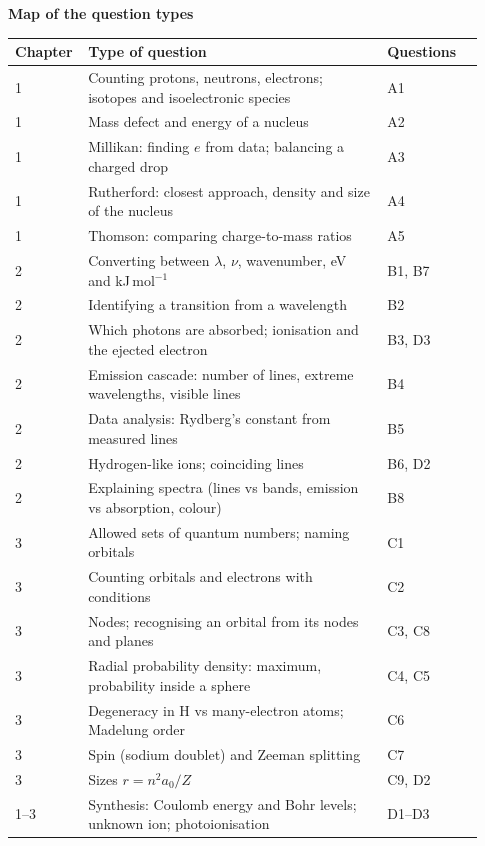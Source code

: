 \documentclass[11pt]{article}
\begin{document}
\vspace{2mm}
{\sffamily\bfseries\color{heading} Map of the question types}\par\vspace{1mm}
{\small
\renewcommand{\arraystretch}{1.12}
\begin{tabular}{@{}p{0.11\linewidth}p{0.62\linewidth}p{0.2\linewidth}@{}}
\toprule
Chapter & Type of question & Questions\\
\midrule
1 & Counting protons, neutrons, electrons; isotopes and isoelectronic species & A1\\
1 & Mass defect and energy of a nucleus & A2\\
1 & Millikan: finding $e$ from data; balancing a charged drop & A3\\
1 & Rutherford: closest approach, density and size of the nucleus & A4\\
1 & Thomson: comparing charge-to-mass ratios & A5\\
2 & Converting between $\lambda$, $\nu$, wavenumber, eV and kJ\,mol$^{-1}$ & B1, B7\\
2 & Identifying a transition from a wavelength & B2\\
2 & Which photons are absorbed; ionisation and the ejected electron & B3, D3\\
2 & Emission cascade: number of lines, extreme wavelengths, visible lines & B4\\
2 & Data analysis: Rydberg's constant from measured lines & B5\\
2 & Hydrogen-like ions; coinciding lines & B6, D2\\
2 & Explaining spectra (lines vs bands, emission vs absorption, colour) & B8\\
3 & Allowed sets of quantum numbers; naming orbitals & C1\\
3 & Counting orbitals and electrons with conditions & C2\\
3 & Nodes; recognising an orbital from its nodes and planes & C3, C8\\
3 & Radial probability density: maximum, probability inside a sphere & C4, C5\\
3 & Degeneracy in H vs many-electron atoms; Madelung order & C6\\
3 & Spin (sodium doublet) and Zeeman splitting & C7\\
3 & Sizes $r = n^2 a_0/Z$ & C9, D2\\
1--3 & Synthesis: Coulomb energy and Bohr levels; unknown ion; photoionisation & D1--D3\\
\bottomrule
\end{tabular}}
\end{document}
